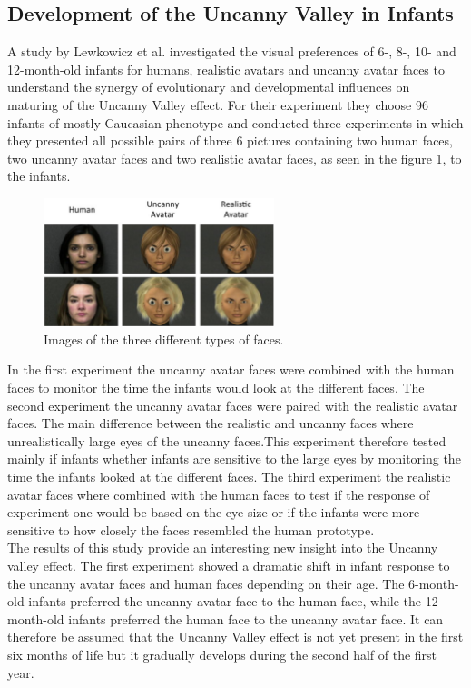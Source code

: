 \subsection{Development of the Uncanny Valley in Infants}
A study by Lewkowicz et al. \cite{uncanny_infants} investigated the visual preferences of 6-, 8-, 10- and 12-month-old infants for humans, realistic avatars and uncanny avatar faces to understand the synergy of evolutionary and developmental influences on maturing of the Uncanny Valley effect. For their experiment they choose 96 infants of mostly Caucasian phenotype and conducted three experiments in which they presented all possible pairs of three 6 pictures containing two human faces, two uncanny avatar faces and two realistic avatar faces, as seen in the figure \ref{fig:uncannyInfants}, to the infants. 
\begin{figure} %
    \centering
    \includegraphics[width=0.6\textwidth]{graphics/uncanny_infants.png}
    \caption{Images of the three different types of faces.}
    \label{fig:uncannyInfants}
\end{figure}
In the first experiment the uncanny avatar faces were combined with the human faces to monitor the time the infants would look at the different faces. The second experiment the uncanny avatar faces were paired with the realistic avatar faces. The main difference between the realistic and uncanny faces where unrealistically large eyes of the uncanny faces.This experiment therefore tested mainly if infants whether infants are sensitive to the large eyes by monitoring the time the infants looked at the different faces. The third experiment the realistic avatar faces where combined with the human faces to test if the response of experiment one would be based on the eye size or if the infants were more sensitive to how closely the faces resembled the human prototype.\cite{uncanny_infants}\\
The results of this study provide an interesting new insight into the Uncanny valley effect. The first experiment showed a dramatic shift in infant response to the uncanny avatar faces and human faces depending on their age. The 6-month-old infants preferred the uncanny avatar face to the human face, while the 12-month-old infants preferred the human face to the uncanny avatar face. It can therefore be assumed that the Uncanny Valley effect is not yet present in the first six months of life but it gradually develops during the second half of the first year. \cite{uncanny_infants}\\
